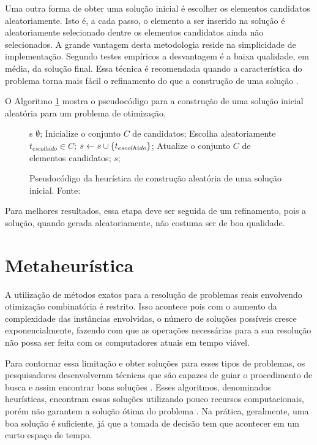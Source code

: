 Uma outra forma de obter uma solução inicial é escolher os elementos
candidatos aleatoriamente. Isto é, a cada passo, o elemento a ser inserido na
solução é aleatoriamente selecionado dentre os elementos candidatos
ainda não selecionados. A grande vantagem desta metodologia reside na
simplicidade de implementação. Segundo testes empíricos a desvantagem é a
baixa qualidade, em média, da solução final. Essa técnica é recomendada quando
a característica do problema torna mais fácil o refinamento do que a construção
de uma solução \cite{notasmarcone}.

O Algoritmo \ref{alg:heurconsaleatoria} mostra o pseudocódigo para a construção
de uma solução inicial aleatória para um problema de otimização.

\begin{figure}[h]
\caption{Pseudocódigo da heurística de construção aleatória de uma
solução inicial. \newline \mbox{Fonte:
\cite{notasmarcone}}}\label{alg:heurconsaleatoria}
\begin{programma}
\STATE s \GETS $\emptyset$;
\STATE Inicialize o conjunto $C$ de candidatos;
\STATE Escolha aleatoriamente $t_{escolhido} \in C$;
\STATE $s \leftarrow s \cup \{t_{escolhido}\}$;
\STATE Atualize o conjunto $C$ de elementos candidatos;
\ENDWHILE
\STATE\RETURN $s$;
\ENDALGORITHM
\end{programma}
\end{figure}

Para melhores resultados, essa etapa deve ser seguida de um refinamento, pois a
solução, quando gerada aleatoriamente, não costuma ser de boa qualidade.

\section{Metaheurística}

A utilização de métodos exatos para a resolução de problemas reais envolvendo
otimização combinatória é restrito. Isso acontece pois com o aumento da
complexidade das instâncias envolvidas, o número de soluções possíveis cresce
exponencialmente, fazendo com que as operações necessárias para a sua resolução
não possa ser feita com os computadores atuais em tempo viável.

Para contornar essa limitação e obter soluções para esses tipos de problemas,
os pesquisadores desenvolveram técnicas que são capazes de guiar o procedimento
de busca e assim encontrar boas soluções \cite{resende1995}. Esses algoritmos,
denominados heurísticas, encontram essas soluções utilizando pouco recursos
computacionais, porém não garantem a solução ótima do problema \cite{dias2006}.
Na prática, geralmente, uma boa solução é suficiente, já que a tomada de
decisão tem que acontecer em um curto espaço de tempo.

